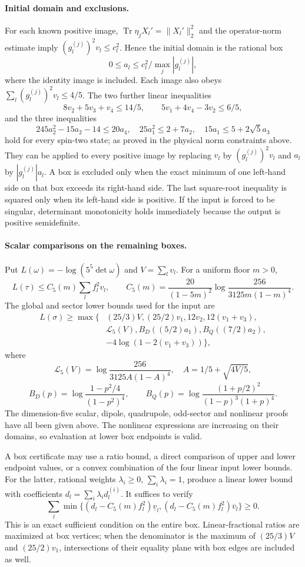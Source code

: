 \documentclass[11pt,a4paper]{article}
\begin{document}
\paragraph{Initial domain and exclusions.}
For each known positive image, $\operatorname{Tr}\eta_jX_l'=\|X_l'\|_2^2$
and the operator-norm estimate imply
$(g_l^{(j)})^2v_l\le c_l^2$. Hence the initial domain is the rational box
\[
 0\le a_l\le c_l^2/\max_j|g_l^{(j)}|,
\]
where the identity image is included. Each image also obeys
$\sum_l(g_l^{(j)})^2v_l\le4/5$. The two further linear inequalities
\[
 8v_2+5v_3+v_4\le14/5,\qquad 5v_1+4v_4-3v_2\le6/5,
\]
and the three inequalities
\[
 245a_2^2-15a_2-14\le20a_4,\quad
 25a_1^2\le2+7a_2,\quad15a_1\le5+2\sqrt5a_3
\]
hold for every spin-two state; as proved in the physical norm constraints above.
They can be applied to every positive image by replacing $v_l$ by
$(g_l^{(j)})^2v_l$ and $a_l$ by $|g_l^{(j)}|a_l$.
A box is excluded only when the exact minimum of one left-hand side on
that box exceeds its right-hand side. The last square-root inequality
is squared only when its left-hand side is positive.
If the input is forced to be singular, determinant monotonicity holds
immediately because the output is positive semidefinite.

\paragraph{Scalar comparisons on the remaining boxes.}
Put $L(\omega)=-\log(5^5\det\omega)$ and $V=\sum_lv_l$.
For a uniform floor $m>0$,
\[
 L(\tau)\le C_5(m)\sum_lf_l^2v_l,\qquad
 C_5(m)=\frac{20}{(1-5m)^2}
 \log\frac{256}{3125m(1-m)^4}.
\]
The global and sector lower bounds used for the input are
\[
 \begin{split}
 L(\sigma)\ge\max\bigl\{&(25/3)V,(25/2)v_1,12v_2,12(v_1+v_3),\\
 &\mathcal L_5(V),B_D((5/2)a_1),B_Q((7/2)a_2),\\
 &-4\log(1-2(v_1+v_3))\bigr\},
 \end{split}
\]
where
\[
 \mathcal L_5(V)=\log\frac{256}{3125A(1-A)^4},\quad
 A=1/5+\sqrt{4V/5},
\]
\[
 B_D(p)=\log\frac{1-p^2/4}{(1-p^2)^4},\qquad
 B_Q(p)=\log\frac{(1+p/2)^2}{(1-p)^3(1+p)^4}.
\]
The dimension-five scalar, dipole, quadrupole, odd-sector and nonlinear
proofs have all been given above. The nonlinear expressions are increasing on their
domains, so evaluation at lower box endpoints is valid.

A box certificate may use a ratio bound, a direct comparison of upper
and lower endpoint values, or a convex combination of the four linear
input lower bounds. For the latter, rational weights $\lambda_i\ge0$,
$\sum_i\lambda_i=1$, produce a linear lower bound with coefficients
$d_l=\sum_i\lambda_i d_l^{(i)}$. It suffices to verify
\[
 \sum_l\min\{(d_l-C_5(m)f_l^2)\underline v_l,
                  (d_l-C_5(m)f_l^2)\overline v_l\}\ge0.
\]
This is an exact sufficient condition on the entire box.
Linear-fractional ratios are maximized at box vertices; when the
denominator is the maximum of $(25/3)V$ and $(25/2)v_1$, intersections
of their equality plane with box edges are included as well.
\end{document}
